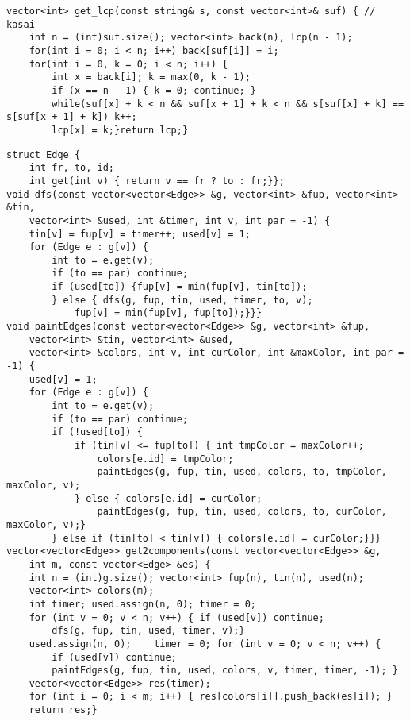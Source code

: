 \documentclass[12pt]{article}
\begin{document}
\begin{verbatim}
vector<int> get_lcp(const string& s, const vector<int>& suf) { // kasai
    int n = (int)suf.size(); vector<int> back(n), lcp(n - 1);
    for(int i = 0; i < n; i++) back[suf[i]] = i;
    for(int i = 0, k = 0; i < n; i++) {
        int x = back[i]; k = max(0, k - 1);
        if (x == n - 1) { k = 0; continue; }
        while(suf[x] + k < n && suf[x + 1] + k < n && s[suf[x] + k] == s[suf[x + 1] + k]) k++;
        lcp[x] = k;}return lcp;}
\end{verbatim}

\begin{verbatim}
struct Edge {
    int fr, to, id;
    int get(int v) { return v == fr ? to : fr;}};
void dfs(const vector<vector<Edge>> &g, vector<int> &fup, vector<int> &tin, 
    vector<int> &used, int &timer, int v, int par = -1) {
    tin[v] = fup[v] = timer++; used[v] = 1;
    for (Edge e : g[v]) {
        int to = e.get(v);
        if (to == par) continue;
        if (used[to]) {fup[v] = min(fup[v], tin[to]);
        } else { dfs(g, fup, tin, used, timer, to, v);
            fup[v] = min(fup[v], fup[to]);}}}
void paintEdges(const vector<vector<Edge>> &g, vector<int> &fup, 
    vector<int> &tin, vector<int> &used,
    vector<int> &colors, int v, int curColor, int &maxColor, int par = -1) {
    used[v] = 1;
    for (Edge e : g[v]) {
        int to = e.get(v);
        if (to == par) continue;
        if (!used[to]) {
            if (tin[v] <= fup[to]) { int tmpColor = maxColor++;
                colors[e.id] = tmpColor;
                paintEdges(g, fup, tin, used, colors, to, tmpColor, maxColor, v);
            } else { colors[e.id] = curColor;
                paintEdges(g, fup, tin, used, colors, to, curColor, maxColor, v);}
        } else if (tin[to] < tin[v]) { colors[e.id] = curColor;}}}
vector<vector<Edge>> get2components(const vector<vector<Edge>> &g, 
    int m, const vector<Edge> &es) {
    int n = (int)g.size(); vector<int> fup(n), tin(n), used(n); 
    vector<int> colors(m);
    int timer; used.assign(n, 0); timer = 0;
    for (int v = 0; v < n; v++) { if (used[v]) continue;
        dfs(g, fup, tin, used, timer, v);}
    used.assign(n, 0);    timer = 0; for (int v = 0; v < n; v++) {
        if (used[v]) continue;
        paintEdges(g, fup, tin, used, colors, v, timer, timer, -1); }
    vector<vector<Edge>> res(timer);
    for (int i = 0; i < m; i++) { res[colors[i]].push_back(es[i]); }
    return res;}
\end{verbatim}
\end{document}
